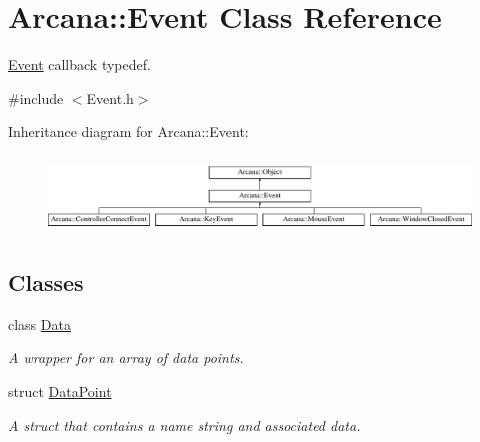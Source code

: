 \hypertarget{class_arcana_1_1_event}{}\section{Arcana\+:\+:Event Class Reference}
\label{class_arcana_1_1_event}


\mbox{\hyperlink{class_arcana_1_1_event}{Event}} callback typedef.  




{\ttfamily \#include $<$Event.\+h$>$}

Inheritance diagram for Arcana\+:\+:Event\+:\begin{figure}[H]
\begin{center}
\leavevmode
\includegraphics[height=2.068965cm]{class_arcana_1_1_event}
\end{center}
\end{figure}
\subsection*{Classes}
\begin{DoxyCompactItemize}
\item 
class \mbox{\hyperlink{class_arcana_1_1_event_1_1_data}{Data}}
\begin{DoxyCompactList}\small\item\em A wrapper for an array of data points. \end{DoxyCompactList}\item 
struct \mbox{\hyperlink{struct_arcana_1_1_event_1_1_data_point}{Data\+Point}}
\begin{DoxyCompactList}\small\item\em A struct that contains a name string and associated data. \end{DoxyCompactList}\end{DoxyCompactItemize}
